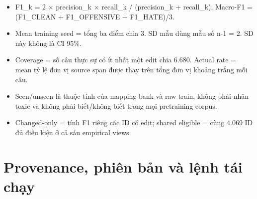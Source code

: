 \documentclass[11pt,a4paper]{article}
\begin{document}
\begin{itemize}

\item F1\_k = 2 \ensuremath{\times} precision\_k \ensuremath{\times} recall\_k / (precision\_k + recall\_k); Macro-F1 = (F1\_CLEAN + F1\_OFFENSIVE + F1\_HATE)/3.

\item Mean training seed = tổng ba điểm chia 3. SD mẫu dùng mẫu số n-1 = 2. SD này không là CI 95\%.

\item Coverage = số câu thực sự có ít nhất một edit chia 6.680. Actual rate = mean tỷ lệ đơn vị source span được thay trên tổng đơn vị khoảng trắng mỗi câu.

\item Seen/unseen là thuộc tính của mapping bank và raw train, không phải nhãn toxic và không phải biết/không biết trong mọi pretraining corpus.

\item Changed-only = tính F1 riêng các ID có edit; shared eligible = cùng 4.069 ID đủ điều kiện ở cả sáu empirical views.

\end{itemize}

\FloatBarrier\section{Provenance, phiên bản và lệnh tái chạy}
\end{document}

